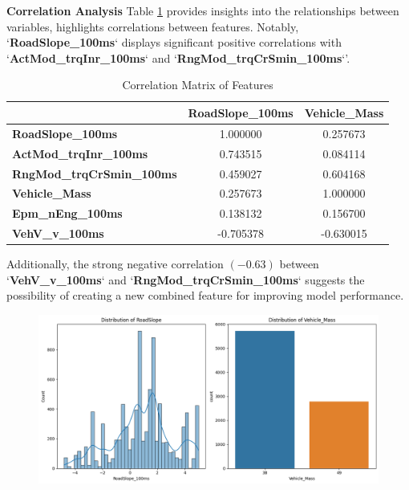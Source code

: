 \documentclass[conference]{IEEEtran}
\begin{document}
\noindent \textbf{Correlation Analysis} \hspace{0.2em} Table \ref{tab:correlation} provides insights into the relationships between variables, highlights correlations between features. Notably, `\textbf{RoadSlope\_100ms}` displays significant positive correlations with `\textbf{ActMod\_trqInr\_100ms}` and `\textbf{RngMod\_trqCrSmin\_100ms}`'.

\begin{table}[ht]
    \centering
    \begin{tabular}{lcc}
      \toprule
      & \textbf{RoadSlope\_100ms} & \textbf{Vehicle\_Mass} \\
      \midrule
      \textbf{RoadSlope\_100ms} & 1.000000 & 0.257673 \\
      \textbf{ActMod\_trqInr\_100ms} & 0.743515 & 0.084114 \\
      \textbf{RngMod\_trqCrSmin\_100ms} & 0.459027 & 0.604168 \\
      \textbf{Vehicle\_Mass} & 0.257673 & 1.000000 \\
      \textbf{Epm\_nEng\_100ms} & 0.138132 & 0.156700 \\
      \textbf{VehV\_v\_100ms} & -0.705378 & -0.630015 \\
      \bottomrule
    \end{tabular}
    \caption{Correlation Matrix of Features}
    \label{tab:correlation}
\end{table}

Additionally, the strong negative correlation $(-0.63)$ between `\textbf{VehV\_v\_100ms}` and `\textbf{RngMod\_trqCrSmin\_100ms}` suggests the possibility of creating a new combined feature for improving model performance.

\begin{figure}[t]
    \centering
    \includegraphics[width=\textwidth, height=0.3\textheight]{Distribution.png}
    \label{fig:roadslopedistribution}
\end{figure}
\end{document}
